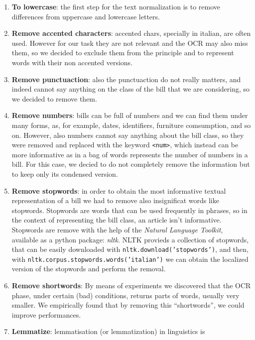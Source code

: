 \documentclass[10pt,twocolumn,letterpaper]{article}
\newcommand\codeinline[1]{\texttt{#1}}  %
\begin{document}
\begin{enumerate}
  \item \textbf{To lowercase}: the first step for the text normalization is to
    remove differences from uppercase and lowercase letters.
  \item \textbf{Remove accented characters}: accented chars, specially in
    italian, are often used. However for our task they are not relevant
    and the OCR may also miss them, so we decided to exclude them from
    the principle and to represent words with their non accented
    versions.
  \item \textbf{Remove punctuaction}: also the punctuaction do not really
    matters, and indeed cannot say anything on the class of the bill
    that we are considering, so we decided to remove them.
  \item \textbf{Remove numbers}: bills can be full of numbers and we can find
    them under many forms, as, for example, dates, identifiers,
    furniture comsumption, and so on. However, also numbers cannot say
    anything about the bill class, so they were removed and replaced
    with the keyword \codeinline{<num>}, which instead can be more
    informative as in a bag of words represents the number of numbers
    in a bill. For this case, we decied to do not completely remove
    the information but to keep only its condensed version.
  \item \textbf{Remove stopwords}: in order to obtain the most informative
    textual representation of a bill we had to remove also
    insignificat words like stopwords. Stopwords are words that can be
    used frequently in phrases, so in the context of representing the
    bill class, an article isn't informative. Stopwords are remove
    with the help of the \emph{Natural Language Toolkit}, available as
    a python package: \emph{nltk}. NLTK provieds a collection of
    stopwords, that can be easily downloaded with
    \codeinline{nltk.download('stopwords')}, and then, with
    \codeinline{nltk.corpus.stopwords.words('italian')} we can obtain the
    localized version of the stopwords and perform the removal.
  \item \textbf{Remove shortwords}: By means of experiments we discovered that
    the OCR phase, under certain (bad) conditions, returns parts of
    words, usually very smaller. We empirically found that by removing
    this ``shortwords'', we could improve performances.
  \item \textbf{Lemmatize}: lemmatisation (or lemmatization) in linguistics is

\end{enumerate}
\end{document}
